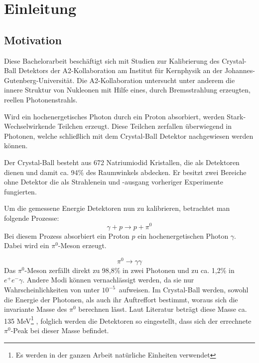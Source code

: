 \documentclass[a4paper,11pt,oneside,final,german,openbib,pdftex]{scrbook}
\begin{document}
\mainmatter
\sloppy

\chapter{Einleitung}

\section{Motivation}
{
	Diese Bachelorarbeit beschäftigt sich mit Studien zur Kalibrierung des Crystal-Ball Detektors der A2-Kollaboration am Institut für Kernphysik an der Johannes-Gutenberg-Universität.
	Die A2-Kollaboration untersucht unter anderem die innere Struktur von Nukleonen mit Hilfe eines, durch Bremsstrahlung erzeugten, reellen Photonenstrahls. 
	
	Wird ein hochenergetisches Photon durch ein Proton absorbiert, werden Stark-Wechselwirkende Teilchen erzeugt. Diese Teilchen zerfallen überwiegend in Photonen, welche schließlich mit dem Crystal-Ball Detektor nachgewiesen werden können. 
	
	Der Crystal-Ball besteht aus 672 Natriumiodid Kristallen, die als Detektoren dienen und damit ca. 94\% des Raumwinkels abdecken.
	Er besitzt zwei Bereiche ohne Detektor die als Strahlenein und -ausgang vorheriger Experimente fungierten.
	
	Um die gemessene Energie Detektoren nun zu kalibrieren, betrachtet man folgende Prozesse:
\begin{equation}
	\gamma + p \rightarrow p + \pi^0
	\label{eq.gammascattering}
\end{equation} 
Bei diesem Prozess absorbiert ein Proton $p$ ein hochenergetischen Photon $\gamma$. Dabei wird ein $\pi^0$-Meson erzeugt.

	\begin{equation}
		\pi^0\rightarrow \gamma \gamma
		\label{eq.pi0decay}
	\end{equation}
Das $\pi^0$-Meson zerfällt direkt zu 98,8\% in zwei Photonen und zu ca. 1,2\% in $e^+e^- \gamma$. Andere Modi können vernachlässigt werden, da sie nur Wahrscheinlichkeiten von unter $10^{-5}$\ aufweisen. Im Crystal-Ball werden, sowohl die Energie der Photonen, als auch ihr Auftreffort bestimmt, woraus sich die invariante Masse des $\pi^0$ berechnen lässt.
Laut Literatur betr\"agt diese Masse ca. 135 MeV\footnote{Es werden in der ganzen Arbeit nat\"urliche Einheiten verwendet} \cite{PDG16}, folglich werden die Detektoren so eingestellt, dass sich der errechnete $\pi^0$-Peak bei dieser Masse befindet. 

}
\end{document}
